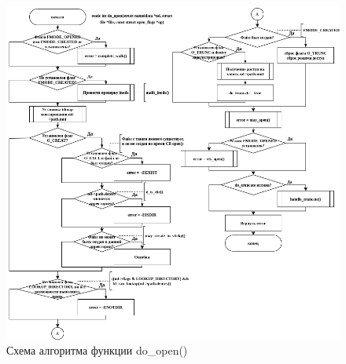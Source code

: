\begin{figure}[H]
	\centering
	\includegraphics[scale=0.6]{assets/lab06-do_open.drawio.png}
	\caption{Схема алгоритма функции do\_open()}
\end{figure}